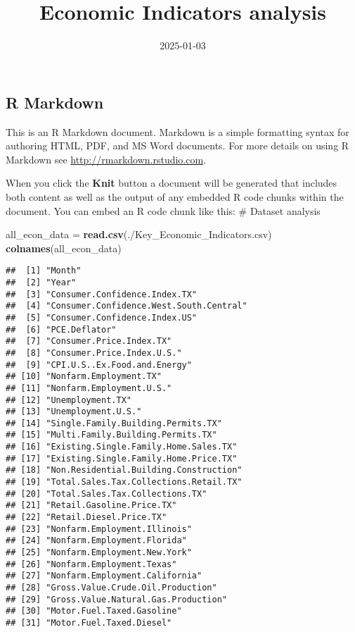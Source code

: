 \documentclass[
]{article}
\title{Economic Indicators analysis}
\author{}
\date{\vspace{-2.5em}2025-01-03}
\newenvironment{Shaded}{\begin{snugshade}}{\end{snugshade}}
\newcommand{\FunctionTok}[1]{\textcolor[rgb]{0.13,0.29,0.53}{\textbf{#1}}}
\newcommand{\NormalTok}[1]{#1}
\newcommand{\OtherTok}[1]{\textcolor[rgb]{0.56,0.35,0.01}{#1}}
\newcommand{\StringTok}[1]{\textcolor[rgb]{0.31,0.60,0.02}{#1}}
\begin{document}
\maketitle

\hypertarget{r-markdown}{%
\subsection{R Markdown}\label{r-markdown}}

This is an R Markdown document. Markdown is a simple formatting syntax
for authoring HTML, PDF, and MS Word documents. For more details on
using R Markdown see \url{http://rmarkdown.rstudio.com}.

When you click the \textbf{Knit} button a document will be generated
that includes both content as well as the output of any embedded R code
chunks within the document. You can embed an R code chunk like this: \#
Dataset analysis

\begin{Shaded}
\begin{Highlighting}[]
\NormalTok{all\_econ\_data }\OtherTok{=} \FunctionTok{read.csv}\NormalTok{(}\StringTok{\textquotesingle{}./Key\_Economic\_Indicators.csv\textquotesingle{}}\NormalTok{)}
\FunctionTok{colnames}\NormalTok{(all\_econ\_data)}
\end{Highlighting}
\end{Shaded}

\begin{verbatim}
##  [1] "Month"                                 
##  [2] "Year"                                  
##  [3] "Consumer.Confidence.Index.TX"          
##  [4] "Consumer.Confidence.West.South.Central"
##  [5] "Consumer.Confidence.Index.US"          
##  [6] "PCE.Deflator"                          
##  [7] "Consumer.Price.Index.TX"               
##  [8] "Consumer.Price.Index.U.S."             
##  [9] "CPI.U.S..Ex.Food.and.Energy"           
## [10] "Nonfarm.Employment.TX"                 
## [11] "Nonfarm.Employment.U.S."               
## [12] "Unemployment.TX"                       
## [13] "Unemployment.U.S."                     
## [14] "Single.Family.Building.Permits.TX"     
## [15] "Multi.Family.Building.Permits.TX"      
## [16] "Existing.Single.Family.Home.Sales.TX"  
## [17] "Existing.Single.Family.Home.Price.TX"  
## [18] "Non.Residential.Building.Construction" 
## [19] "Total.Sales.Tax.Collections.Retail.TX" 
## [20] "Total.Sales.Tax.Collections.TX"        
## [21] "Retail.Gasoline.Price.TX"              
## [22] "Retail.Diesel.Price.TX"                
## [23] "Nonfarm.Employment.Illinois"           
## [24] "Nonfarm.Employment.Florida"            
## [25] "Nonfarm.Employment.New.York"           
## [26] "Nonfarm.Employment.Texas"              
## [27] "Nonfarm.Employment.California"         
## [28] "Gross.Value.Crude.Oil.Production"      
## [29] "Gross.Value.Natural.Gas.Production"    
## [30] "Motor.Fuel.Taxed.Gasoline"             
## [31] "Motor.Fuel.Taxed.Diesel"
\end{verbatim}
\end{document}
